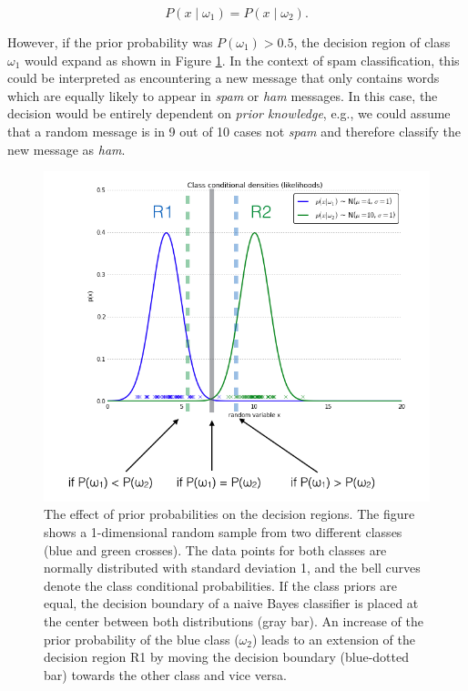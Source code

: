 \documentclass{article}
\begin{document}
\begin{equation}  P(x \mid \omega_1) = P(x \mid \omega_2).\end{equation}

However, if the prior probability was $P(\omega_1) > 0.5$, the decision region of class $\omega_1$ would expand as shown in Figure \ref{fig:effect_priors}. In the context of spam classification, this could be interpreted as encountering a new message that only contains words which are equally likely to appear in \emph{spam} or \emph{ham} messages. In this case, the decision would be entirely dependent on \emph{prior knowledge}, e.g., we could assume that a random message is in 9 out of 10 cases not \emph{spam} and therefore classify the new message as \emph{ham}.



\begin{figure}[h!]
\includegraphics[width=\linewidth]{../images/effect_priors_1.png}
\caption{The effect of prior probabilities on the decision regions. The figure shows a 1-dimensional random sample from two different classes (blue and green crosses). The data points for both classes are normally distributed with standard deviation 1, and the bell curves denote the class conditional probabilities. If the class priors are equal, the decision boundary of a naive Bayes classifier is placed at the center between both distributions (gray bar). An increase of the prior probability of the blue class ($\omega_2$) leads to an extension of the decision region R1 by moving the decision boundary (blue-dotted bar) towards the other class and vice versa.}
\label{fig:effect_priors}
\end{figure}
\end{document}
